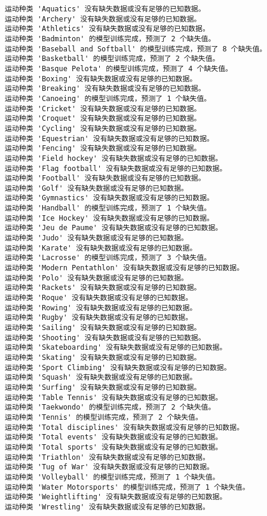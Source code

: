 \documentclass[11pt]{article}
\begin{document}
    \begin{Verbatim}[commandchars=\\\{\}]
运动种类 'Aquatics' 没有缺失数据或没有足够的已知数据。
运动种类 'Archery' 没有缺失数据或没有足够的已知数据。
运动种类 'Athletics' 没有缺失数据或没有足够的已知数据。
运动种类 'Badminton' 的模型训练完成，预测了 2 个缺失值。
运动种类 'Baseball and Softball' 的模型训练完成，预测了 8 个缺失值。
运动种类 'Basketball' 的模型训练完成，预测了 2 个缺失值。
运动种类 'Basque Pelota' 的模型训练完成，预测了 4 个缺失值。
运动种类 'Boxing' 没有缺失数据或没有足够的已知数据。
运动种类 'Breaking' 没有缺失数据或没有足够的已知数据。
运动种类 'Canoeing' 的模型训练完成，预测了 1 个缺失值。
运动种类 'Cricket' 没有缺失数据或没有足够的已知数据。
运动种类 'Croquet' 没有缺失数据或没有足够的已知数据。
运动种类 'Cycling' 没有缺失数据或没有足够的已知数据。
运动种类 'Equestrian' 没有缺失数据或没有足够的已知数据。
运动种类 'Fencing' 没有缺失数据或没有足够的已知数据。
运动种类 'Field hockey' 没有缺失数据或没有足够的已知数据。
运动种类 'Flag football' 没有缺失数据或没有足够的已知数据。
运动种类 'Football' 没有缺失数据或没有足够的已知数据。
运动种类 'Golf' 没有缺失数据或没有足够的已知数据。
运动种类 'Gymnastics' 没有缺失数据或没有足够的已知数据。
运动种类 'Handball' 的模型训练完成，预测了 1 个缺失值。
运动种类 'Ice Hockey' 没有缺失数据或没有足够的已知数据。
运动种类 'Jeu de Paume' 没有缺失数据或没有足够的已知数据。
运动种类 'Judo' 没有缺失数据或没有足够的已知数据。
运动种类 'Karate' 没有缺失数据或没有足够的已知数据。
运动种类 'Lacrosse' 的模型训练完成，预测了 3 个缺失值。
运动种类 'Modern Pentathlon' 没有缺失数据或没有足够的已知数据。
运动种类 'Polo' 没有缺失数据或没有足够的已知数据。
运动种类 'Rackets' 没有缺失数据或没有足够的已知数据。
运动种类 'Roque' 没有缺失数据或没有足够的已知数据。
运动种类 'Rowing' 没有缺失数据或没有足够的已知数据。
运动种类 'Rugby' 没有缺失数据或没有足够的已知数据。
运动种类 'Sailing' 没有缺失数据或没有足够的已知数据。
运动种类 'Shooting' 没有缺失数据或没有足够的已知数据。
运动种类 'Skateboarding' 没有缺失数据或没有足够的已知数据。
运动种类 'Skating' 没有缺失数据或没有足够的已知数据。
运动种类 'Sport Climbing' 没有缺失数据或没有足够的已知数据。
运动种类 'Squash' 没有缺失数据或没有足够的已知数据。
运动种类 'Surfing' 没有缺失数据或没有足够的已知数据。
运动种类 'Table Tennis' 没有缺失数据或没有足够的已知数据。
运动种类 'Taekwondo' 的模型训练完成，预测了 2 个缺失值。
运动种类 'Tennis' 的模型训练完成，预测了 2 个缺失值。
运动种类 'Total disciplines' 没有缺失数据或没有足够的已知数据。
运动种类 'Total events' 没有缺失数据或没有足够的已知数据。
运动种类 'Total sports' 没有缺失数据或没有足够的已知数据。
运动种类 'Triathlon' 没有缺失数据或没有足够的已知数据。
运动种类 'Tug of War' 没有缺失数据或没有足够的已知数据。
运动种类 'Volleyball' 的模型训练完成，预测了 1 个缺失值。
运动种类 'Water Motorsports' 的模型训练完成，预测了 1 个缺失值。
运动种类 'Weightlifting' 没有缺失数据或没有足够的已知数据。
运动种类 'Wrestling' 没有缺失数据或没有足够的已知数据。


\end{Verbatim}
\end{document}
